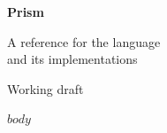 \documentclass[10pt,twoside,openright]{book}
\begin{document}
\frontmatter
\thispagestyle{empty}
\begin{center}
\vspace*{0.25\textheight}
{\fontsize{40}{44}\selectfont\bfseries Prism\par}
\vspace{1em}
{\Large A reference for the language\\and its implementations\par}
\vfill
{\small Working draft\par}
\vspace{0.1\textheight}
\end{center}
\clearpage
\thispagestyle{empty}\null\clearpage
\tableofcontents
\mainmatter
$body$
\end{document}
